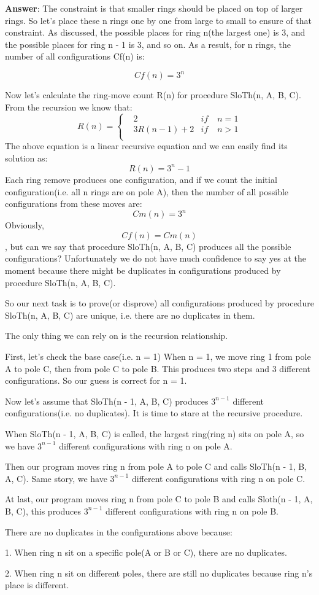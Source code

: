\documentclass[a4paper,11pt]{article}
\theoremstyle{mytheor}
\begin{document}
\textbf{Answer}: The constraint is that smaller rings should be placed on top of larger rings. So let's place these n rings one by one from large to small to ensure of that constraint. As discussed, the possible places for ring n(the largest one) is 3, and the possible places for ring n - 1 is 3, and so on. As a result, for n rings, the number of all configurations Cf(n) is:

$$Cf(n) = 3^{n}$$

Now let's calculate the ring-move count R(n) for procedure SloTh(n, A, B, C).
From the recursion we know that:
$$R(n)=\left\{
\begin{aligned}
&2  & if\; &  n = 1 \\
&3R(n-1) + 2  & if\; &  n > 1 \\
\end{aligned}
\right.
$$
The above equation is a linear recursive equation and we can easily find its solution as:
$$
R(n) = 3^{n} - 1
$$
Each ring remove produces one configuration, and if we count the initial configuration(i.e. all n rings are on pole A), then the number of all possible configurations from these moves are:
$$
Cm(n) = 3^{n}
$$
Obviously, $$Cf(n) = Cm(n)$$, but can we say that procedure SloTh(n, A, B, C) produces all the possible configurations? Unfortunately we do not have much confidence to say yes at the moment because there might be duplicates in configurations produced by procedure SloTh(n, A, B, C).

So our next task is to prove(or disprove) all configurations produced by procedure SloTh(n, A, B, C) are unique, i.e. there are no duplicates in them.

The only thing we can rely on is the recursion relationship.

First, let's check the base case(i.e. n = 1)
When n = 1, we move ring 1 from pole A to pole C, then from pole C to pole B. This produces two steps and 3 different configurations. So our guess is correct for n = 1.

Now let's assume that SloTh(n - 1, A, B, C) produces $3^{n-1}$ different configurations(i.e. no duplicates). It is time to stare at the recursive procedure.

When SloTh(n - 1, A, B, C) is called, the largest ring(ring n) sits on pole A, so we have $3^{n-1}$ different configurations with ring n on pole A.

Then our program moves ring n from pole A to pole C and calls SloTh(n - 1, B, A, C). Same story, we have $3^{n-1}$ different configurations with ring n on pole C.

At last, our program moves ring n from pole C to pole B and calls Sloth(n - 1, A, B, C), this produces $3^{n-1}$ different configurations with ring n on pole B.

There are no duplicates in the configurations above because:

1. When ring n sit on a specific pole(A or B or C), there are no duplicates.

2. When ring n sit on different poles, there are still no duplicates because ring n's place is different.
\end{document}
